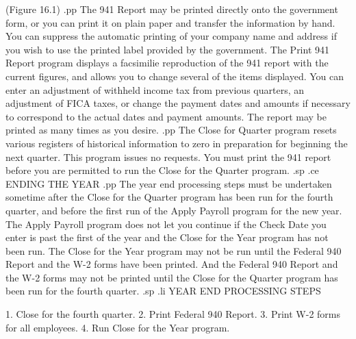 		      (Figure 16.1)
.pp
The 941 Report may be printed directly onto the government form, or
you can print it on plain paper and transfer the information by hand.
You can suppress the automatic printing of your company name and address
if you wish to use the printed label provided by the government.
The Print 941 Report program displays a facsimilie reproduction of the
941 report with the current figures, and allows you to change several
of the items displayed.  You can enter an adjustment of withheld income
tax from previous quarters, an adjustment of FICA taxes, or change
the payment dates and amounts if necessary to correspond to the actual
dates and payment amounts. The report may be printed as many times as
you desire.
.pp
The Close for Quarter program resets various registers of historical
information to zero in preparation for beginning the next quarter.  This
program issues no requests.  You must print the 941 report before you are
permitted to run the Close for the Quarter program.
.sp
.ce
ENDING THE YEAR
.pp
The year end processing steps must be undertaken sometime after the Close
for the Quarter program has been run for the fourth quarter, and before
the first run of the Apply Payroll program for the new year.
The Apply Payroll program does not let you continue if the Check
Date you enter is past the first of the year and the Close for the Year
program has not been run.  The Close for the Year program may not be
run until the Federal 940 Report and the W-2 forms have been printed.
And the Federal 940 Report and the W-2 forms may not be printed until
the Close for the Quarter program has been run for the fourth quarter.
.sp
.li
		   YEAR END PROCESSING STEPS

		1. Close for the fourth quarter.
		2. Print Federal 940 Report.
		3. Print W-2 forms for all employees.
		4. Run Close for the Year program.

